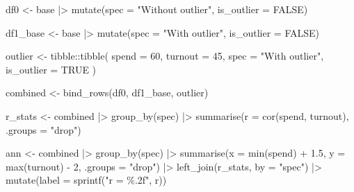 \documentclass[
  letterpaper,
  DIV=11,
  numbers=noendperiod]{scrreprt}
\newenvironment{Shaded}{\begin{snugshade}}{\end{snugshade}}
\newcommand{\AttributeTok}[1]{\textcolor[rgb]{0.40,0.45,0.13}{#1}}
\newcommand{\ConstantTok}[1]{\textcolor[rgb]{0.56,0.35,0.01}{#1}}
\newcommand{\DecValTok}[1]{\textcolor[rgb]{0.68,0.00,0.00}{#1}}
\newcommand{\FloatTok}[1]{\textcolor[rgb]{0.68,0.00,0.00}{#1}}
\newcommand{\FunctionTok}[1]{\textcolor[rgb]{0.28,0.35,0.67}{#1}}
\newcommand{\NormalTok}[1]{\textcolor[rgb]{0.00,0.23,0.31}{#1}}
\newcommand{\OtherTok}[1]{\textcolor[rgb]{0.00,0.23,0.31}{#1}}
\newcommand{\SpecialCharTok}[1]{\textcolor[rgb]{0.37,0.37,0.37}{#1}}
\newcommand{\StringTok}[1]{\textcolor[rgb]{0.13,0.47,0.30}{#1}}
\begin{document}
\begin{Shaded}
\begin{Highlighting}[]
\NormalTok{df0 }\OtherTok{\textless{}{-}}\NormalTok{ base }\SpecialCharTok{|\textgreater{}}
  \FunctionTok{mutate}\NormalTok{(}\AttributeTok{spec =} \StringTok{"Without outlier"}\NormalTok{, }\AttributeTok{is\_outlier =} \ConstantTok{FALSE}\NormalTok{)}

\NormalTok{df1\_base }\OtherTok{\textless{}{-}}\NormalTok{ base }\SpecialCharTok{|\textgreater{}}
  \FunctionTok{mutate}\NormalTok{(}\AttributeTok{spec =} \StringTok{"With outlier"}\NormalTok{, }\AttributeTok{is\_outlier =} \ConstantTok{FALSE}\NormalTok{)}

\NormalTok{outlier }\OtherTok{\textless{}{-}}\NormalTok{ tibble}\SpecialCharTok{::}\FunctionTok{tibble}\NormalTok{(}
  \AttributeTok{spend =} \DecValTok{60}\NormalTok{, }\AttributeTok{turnout =} \DecValTok{45}\NormalTok{, }\AttributeTok{spec =} \StringTok{"With outlier"}\NormalTok{, }\AttributeTok{is\_outlier =} \ConstantTok{TRUE}
\NormalTok{)}

\NormalTok{combined }\OtherTok{\textless{}{-}} \FunctionTok{bind\_rows}\NormalTok{(df0, df1\_base, outlier)}

\NormalTok{r\_stats }\OtherTok{\textless{}{-}}\NormalTok{ combined }\SpecialCharTok{|\textgreater{}}
  \FunctionTok{group\_by}\NormalTok{(spec) }\SpecialCharTok{|\textgreater{}}
  \FunctionTok{summarise}\NormalTok{(}\AttributeTok{r =} \FunctionTok{cor}\NormalTok{(spend, turnout), }\AttributeTok{.groups =} \StringTok{"drop"}\NormalTok{)}

\NormalTok{ann }\OtherTok{\textless{}{-}}\NormalTok{ combined }\SpecialCharTok{|\textgreater{}}
  \FunctionTok{group\_by}\NormalTok{(spec) }\SpecialCharTok{|\textgreater{}}
  \FunctionTok{summarise}\NormalTok{(}\AttributeTok{x =} \FunctionTok{min}\NormalTok{(spend) }\SpecialCharTok{+} \FloatTok{1.5}\NormalTok{, }\AttributeTok{y =} \FunctionTok{max}\NormalTok{(turnout) }\SpecialCharTok{{-}} \DecValTok{2}\NormalTok{, }\AttributeTok{.groups =} \StringTok{"drop"}\NormalTok{) }\SpecialCharTok{|\textgreater{}}
  \FunctionTok{left\_join}\NormalTok{(r\_stats, }\AttributeTok{by =} \StringTok{"spec"}\NormalTok{) }\SpecialCharTok{|\textgreater{}}
  \FunctionTok{mutate}\NormalTok{(}\AttributeTok{label =} \FunctionTok{sprintf}\NormalTok{(}\StringTok{"r = \%.2f"}\NormalTok{, r))}


\end{Highlighting}
\end{Shaded}
\end{document}
